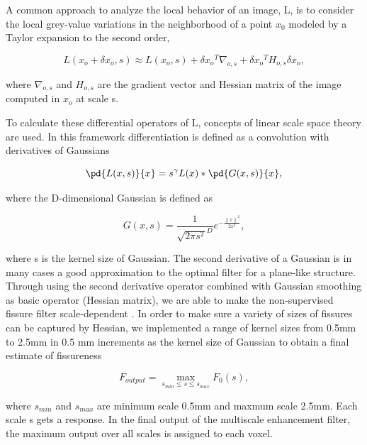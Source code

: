 {A common approach to analyze the local behavior of an image, L, is to consider the local grey-value variations in the neighborhood of a point $x_0$ modeled by a Taylor expansion to the second order,

\begin{equation}
 \label{eq:FissureDetection1}
 L(x_o + \delta x_o, s) \approx L(x_o, s) + \delta{x_o}^T\nabla_{o,s} + \delta{x_o}^TH_{o,s}\delta x_o,
\end{equation}

\noindent where $\nabla_{o,s}$ and $H_{o,s}$ are the gradient vector and Hessian matrix of the image computed in $x_o$ at scale s.

To calculate these differential operators of L, concepts of linear scale space theory \citep{koenderink1984structure,florack1992scale} are used. In this framework differentiation is defined as a convolution with derivatives of Gaussians

\begin{equation}
 \label{eq:FissureDetection2}
 \pd{L(x,s)}{x} = s^\gamma L(x)*\pd{G(x,s)}{x},
\end{equation}

\noindent where the D-dimensional Gaussian is defined as

\begin{equation}
 \label{eq:FissureDetection3}
 G(x,s) = \frac{1}{{\sqrt{2\pi s^2}}^D}e^{-\frac{{\lVert x \rVert}^2}{2x^2}},
\end{equation}

\noindent where s is the kernel size of Gaussian. The second derivative of a Gaussian is in many cases a good approximation to the optimal filter for a plane-like structure. Through using the second derivative operator combined with Gaussian smoothing as basic operator (Hessian matrix), we are able to make the non-supervised fissure filter scale-dependent \citep{lorenz1997multi, li2003selective}. In order to make sure a variety of sizes of fissures can be captured by Hessian, we implemented a range of kernel sizes from 0.5mm to 2.5mm in 0.5 mm increments as the kernel size of Gaussian to obtain a final estimate of fissureness

\begin{equation}
\label{eq:Multiscale}
F_{output} = \operatorname*{max}\limits_{s_{min}\leq s \leq s_{max}} F_0 (s),
\end{equation}

\noindent where $s_{min}$ and $s_{max}$ are minimum scale 0.5mm and maxmum scale 2.5mm. Each scale s gets a response. In the final output of the multiscale enhancement filter, the maximum output over all scales is assigned to each voxel.

}

